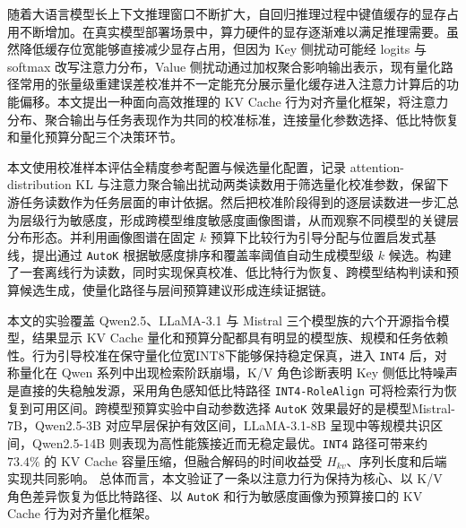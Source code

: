 
\begin{abstractzh}

随着大语言模型长上下文推理窗口不断扩大，自回归推理过程中键值缓存的显存占用不断增加。在真实模型部署场景中，算力硬件的显存逐渐难以满足推理需要。虽然降低缓存位宽能够直接减少显存占用，但因为 Key 侧扰动可能经 logits 与 softmax 改写注意力分布，Value 侧扰动通过加权聚合影响输出表示，现有量化路径常用的张量级重建误差校准并不一定能充分展示量化缓存进入注意力计算后的功能偏移。本文提出一种面向高效推理的 KV Cache 行为对齐量化框架，将注意力分布、聚合输出与任务表现作为共同的校准标准，连接量化参数选择、低比特恢复和量化预算分配三个决策环节。

本文使用校准样本评估全精度参考配置与候选量化配置，记录 attention-distribution KL 与注意力聚合输出扰动两类读数用于筛选量化校准参数，保留下游任务读数作为任务层面的审计依据。然后把校准阶段得到的逐层读数进一步汇总为层级行为敏感度，形成跨模型维度敏感度画像图谱，从而观察不同模型的关键层分布形态。并利用画像图谱在固定 $k$ 预算下比较行为引导分配与位置启发式基线，提出通过 \texttt{AutoK} 根据敏感度排序和覆盖率阈值自动生成模型级 $k$ 候选。构建了一套离线行为读数，同时实现保真校准、低比特行为恢复、跨模型结构判读和预算候选生成，使量化路径与层间预算建议形成连续证据链。

本文的实验覆盖 Qwen2.5、LLaMA-3.1 与 Mistral 三个模型族的六个开源指令模型，结果显示 KV Cache 量化和预算分配都具有明显的模型族、规模和任务依赖性。行为引导校准在保守量化位宽INT8下能够保持稳定保真，进入 \texttt{INT4} 后，对称量化在 Qwen 系列中出现检索阶跃崩塌，K/V 角色诊断表明 Key 侧低比特噪声是直接的失稳触发源，采用角色感知低比特路径 \texttt{INT4-RoleAlign} 可将检索行为恢复到可用区间。跨模型预算实验中自动参数选择 \texttt{AutoK} 效果最好的是模型Mistral-7B，Qwen2.5-3B 对应早层保护有效区间，LLaMA-3.1-8B 呈现中等规模共识区间，Qwen2.5-14B 则表现为高性能簇接近而无稳定最优。\texttt{INT4} 路径可带来约 $73.4\%$ 的 KV Cache 容量压缩，但融合解码的时间收益受 $H_{kv}$、序列长度和后端实现共同影响。
总体而言，本文验证了一条以注意力行为保持为核心、以 K/V 角色差异恢复为低比特路径、以 \texttt{AutoK} 和行为敏感度画像为预算接口的 KV Cache 行为对齐量化框架。


\end{abstractzh}
